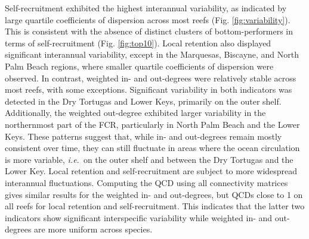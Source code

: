 \documentclass[preprint,12pt,authoryear]{elsarticle}
\newcommand{\ie}{{\it i.e.}\ }
\begin{document}
	Self-recruitment exhibited the highest interannual variability, as indicated by large quartile coefficients of dispersion across most reefs (Fig. \ref{fig:variability}). This is consistent with the absence of distinct clusters of bottom-performers in terms of self-recruitment (Fig. \ref{fig:top10}). Local retention also displayed significant interannual variability, except in the Marquesas, Biscayne, and North Palm Beach regions, where smaller quartile coefficients of dispersion were observed. In contrast, weighted in- and out-degrees were relatively stable across most reefs, with some exceptions. Significant variability in both indicators was detected in the Dry Tortugas and Lower Keys, primarily on the outer shelf. Additionally, the weighted out-degree exhibited larger variability in the northernmost part of the FCR, particularly in North Palm Beach and the Lower Keys. These patterns suggest that, while in- and out-degrees remain mostly consistent over time, they can still fluctuate in areas where the ocean circulation is more variable, \ie on the outer shelf and between the Dry Tortugas and the Lower Key. Local retention and self-recruitment are subject to more widespread interannual fluctuations. Computing the QCD using all connectivity matrices gives similar results for the weighted in- and out-degrees, but QCDs close to 1 on all reefs for local retention and self-recruitment. This indicates that the latter two indicators show significant interspecific variability while weighted in- and out-degrees are more uniform across species.
	
\end{document}
